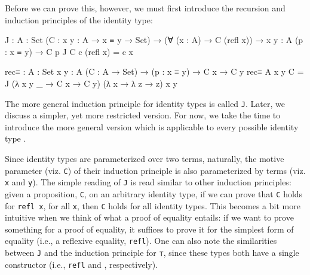 \documentclass[12pt]{article}
\begin{document}
Before we can prove this, however, we must first introduce the recursion and
induction principles of the identity type:
\begin{center}
\begin{minipage}{0.9\textwidth}
\begin{code}
J : {A : Set} (C : {x y : A} → x ≡ y → Set) →
    (∀ (x : A) → C (refl x)) →
    {x y : A} (p : x ≡ y) → C p
J C c (refl x) = c x

rec≡ : {A : Set} {x y : A} (C : A → Set) →
       (p : x ≡ y) → C x → C y
rec≡ {A} {x} {y} C = 
  J (λ {x} {y} _ → C x → C y)
    (λ x → λ z → z)
    {x} {y} 
\end{code}
\end{minipage}
\end{center}
The more general induction principle for identity types is called {\tt J}.
Later, we discuss a simpler, yet more restricted version. For now, we take
the time to introduce the more general version which is applicable to every
possible identity type \cite{}.

Since identity types are parameterized over two terms, naturally, the motive
parameter (viz. {\tt C}) of their induction principle is also parameterized
by terms (viz. {\tt x} and {\tt y}). The simple reading of {\tt J} is read
similar to other induction principles: given a proposition, {\tt C}, on an
arbitrary identity type, if we can prove that {\tt C} holds for {\tt refl x},
for all {\tt x}, then {\tt C} holds for all identity types. This becomes a bit
more intuitive when we think of what a proof of equality entails: if we want
to prove something for a proof of equality, it suffices to prove it for the
simplest form of equality (i.e., a reflexive equality, {\tt refl}). One can
also note the similarities between {\tt J} and the induction principle for
{\tt ⊤}, since these types both have a single constructor (i.e., {\tt refl}
and {\tt *}, respectively).
\end{document}
